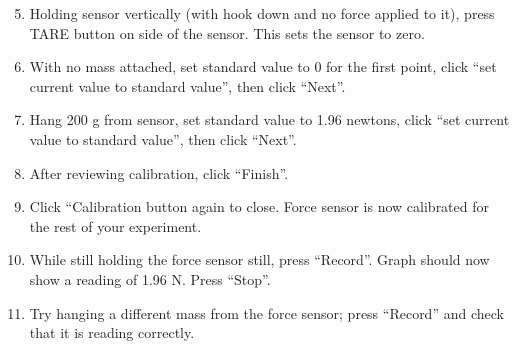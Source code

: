 \begin{enumerate}
\setcounter{enumi}{4}

\item Holding sensor vertically (with hook down and no force applied to it), press TARE button on side of the sensor. This sets the sensor to zero.

\item With no mass attached, set standard value to 0 for the first point, click ``set current value to standard value'', then click ``Next''.

\item Hang 200 g from sensor, set standard value to 1.96 newtons, click ``set current value to standard value'', then click ``Next''.

\item After reviewing calibration, click ``Finish''.

\item Click ``Calibration button again to close. Force sensor is now calibrated for the rest of your experiment.

\item While still holding the force sensor still, press ``Record''. Graph should now show a reading of 1.96 N. Press ``Stop''.

\item Try hanging a different mass from the force sensor; press ``Record'' and check that it is reading correctly.
\end{enumerate}
